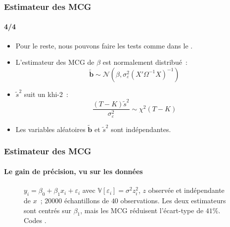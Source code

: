 \documentclass[10pt]{beamer}
\begin{document}
\begin{frame}
  \frametitle{Estimateur des MCG}
  \framesubtitle{4/4}

  \begin{itemize}

  \item Pour le reste, nous pouvons faire les tests comme dans le .\newline

  \item L'estimateur des MCG de $\beta$ est normalement distribué~:
    \[
      \tilde{\mathbf b} \sim \mathcal N\left(\beta, \sigma_{\varepsilon}^2\left(X'\Omega^{-1} X \right)^{-1} \right)
    \]
    \medskip

  \item $\tilde{s}^2$ suit un khi-2~:
    \[
      \frac{(T-K)\tilde{s}^2}{\sigma_{\varepsilon}^2} \sim \chi^2(T-K)
    \]
    \medskip

  \item Les variables aléatoires $\tilde{\mathbf b}$ et $\tilde{s}^2$ sont indépendantes.
  \end{itemize}


\end{frame}


\begin{frame}[c]
  \frametitle{Estimateur des MCG}
  \framesubtitle{Le gain de précision, vu sur les données}

  \begin{figure}
    \centering
    \scalebox{.44}{}
    \caption{$y_i = \beta_0 + \beta_1 x_i + \varepsilon_i$ avec
      $\mathbb V[\varepsilon_i]=\sigma^2 z_i^2$, $z$ observée et indépendante de $x$~;
      $20000$ échantillons de $40$ observations. Les deux estimateurs sont centrés sur
      $\beta_1$, mais les MCG réduisent l'écart-type de $41\%$. Codes
      .}
  \end{figure}

\end{frame}
\end{document}
